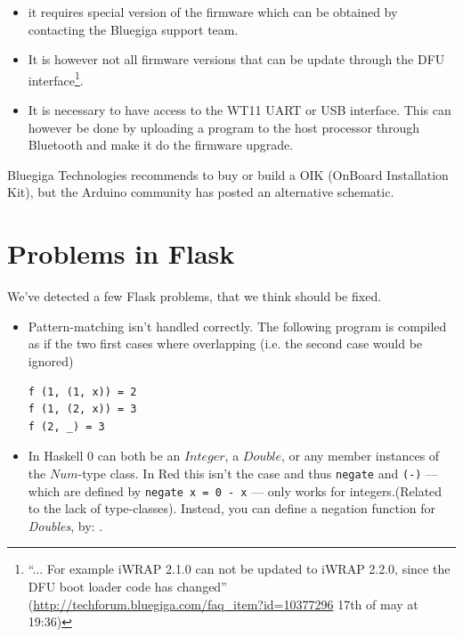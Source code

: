 \documentclass[a4paper, oneside, final]{memoir}
\begin{document}
\begin{itemize}
\item it requires special version of the firmware which can be obtained by
  contacting the Bluegiga support team.

\item It is however not all firmware versions that can be update through the DFU
  interface\footnote{``... For example iWRAP 2.1.0 can not be updated to iWRAP
    2.2.0, since the DFU boot loader code has changed''
    (\url{http://techforum.bluegiga.com/faq_item?id=10377296} 17th of may at
    19:36)}.

\item It is necessary to have access to the WT11 UART or USB
  interface. This can however be done by uploading a program to the host
  processor through Bluetooth and make it do the firmware upgrade.
\end{itemize}

Bluegiga Technologies recommends to buy or build\cite{oik_chematic} a OIK
(OnBoard Installation Kit), but the Arduino community has posted an
alternative schematic\cite{oik_chematic_arduino}.


\chapter{Problems in Flask}
We've detected a few Flask problems, that we think should be fixed.

\begin{itemize}
\item Pattern-matching isn't handled correctly. The following program
  is compiled as if the two first cases where overlapping (i.e. the
  second case would be ignored)
\begin{verbatim}
f (1, (1, x)) = 2
f (1, (2, x)) = 3
f (2, _) = 3
\end{verbatim}

\item In Haskell 0 can both be an $Integer$, a $Double$, or any member
  instances of the $Num$-type class. In Red this isn't the case and
  thus \texttt{negate} and \texttt{(-)} --- which are defined by
  \verb|negate x = 0 - x| --- only works for integers.(Related to the
  lack of type-classes). Instead, you can define a negation function
  for \textit{Doubles}, by: .
\end{itemize}
\end{document}
